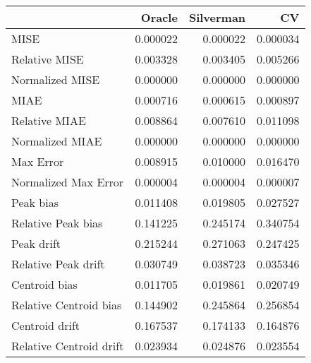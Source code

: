 \begin{tabular}{lrrr}
  \hline
 & Oracle & Silverman & CV \\ 
  \hline
MISE & 0.000022 & 0.000022 & 0.000034 \\ 
  Relative MISE & 0.003328 & 0.003405 & 0.005266 \\ 
  Normalized MISE & 0.000000 & 0.000000 & 0.000000 \\ 
  MIAE & 0.000716 & 0.000615 & 0.000897 \\ 
  Relative MIAE & 0.008864 & 0.007610 & 0.011098 \\ 
  Normalized MIAE & 0.000000 & 0.000000 & 0.000000 \\ 
  Max Error & 0.008915 & 0.010000 & 0.016470 \\ 
  Normalized Max Error & 0.000004 & 0.000004 & 0.000007 \\ 
  Peak bias & 0.011408 & 0.019805 & 0.027527 \\ 
  Relative Peak bias & 0.141225 & 0.245174 & 0.340754 \\ 
  Peak drift & 0.215244 & 0.271063 & 0.247425 \\ 
  Relative Peak drift & 0.030749 & 0.038723 & 0.035346 \\ 
  Centroid bias & 0.011705 & 0.019861 & 0.020749 \\ 
  Relative Centroid bias & 0.144902 & 0.245864 & 0.256854 \\ 
  Centroid drift & 0.167537 & 0.174133 & 0.164876 \\ 
  Relative Centroid drift & 0.023934 & 0.024876 & 0.023554 \\ 
   \hline
\end{tabular}

